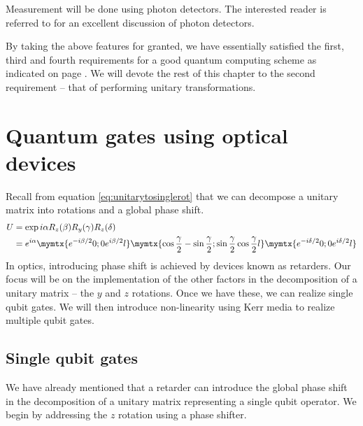 Measurement will be done using photon detectors. The interested reader is referred to \cite{foxqoptics} for an excellent discussion of photon detectors.

By taking the above features for granted, we have essentially satisfied the first, third and fourth requirements for a good quantum computing scheme as indicated on page \pageref{requirements}. We will devote the rest of this chapter to the second requirement -- that of performing unitary transformations.

\section{Quantum gates using optical devices}
Recall from equation \eqref{eq:unitarytosinglerot} that we can decompose a unitary matrix into rotations and a global phase shift. 
\begin{align}
U &= \exp{i\alpha}R_z(\beta)R_y(\gamma)R_z(\delta)\\ 
&= e^{i\alpha}\mymtx{e^{-i\beta/2} 0 ; 0 e^{i\beta/2}l}
\mymtx{\cos\frac{\gamma}{2} -\sin\frac{\gamma}{2} ; \sin\frac{\gamma}{2} \cos\frac{\gamma}{2}l} 
\mymtx{e^{-i\delta/2} 0 ; 0 e^{i\delta/2}l}
\end{align}
In optics, introducing phase shift is achieved by devices known as retarders. Our focus will be on the implementation of the other factors in the decomposition of a unitary matrix -- the $y$ and $z$ rotations. Once we have these, we can realize single qubit gates. We will then introduce non-linearity using Kerr media to realize multiple qubit gates.

\subsection{Single qubit gates}
We have already mentioned that a retarder can introduce the global phase shift in the decomposition of a unitary matrix representing a single qubit operator. We begin by addressing the $z$ rotation using a phase shifter.

